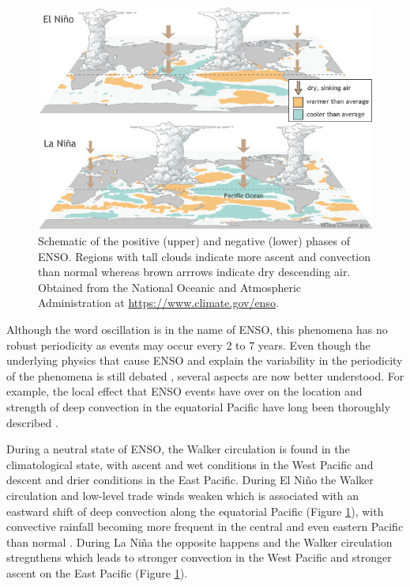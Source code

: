 \begin{figure}[t!]
\centering
\includegraphics[width=\linewidth]{figures/ENSO}
\caption{Schematic of the positive (upper) and negative (lower) phases of ENSO. Regions with tall clouds indicate more ascent and convection than normal whereas brown arrrows indicate dry descending air. Obtained from the National Oceanic and Atmospheric Administration at \url{https://www.climate.gov/enso}. }
\label{fig:enso}
\end{figure}  
  Although the word oscillation is in the name of ENSO, this phenomena has no robust periodicity as events may occur every 2 to 7 years. Even though the underlying physics that cause ENSO and explain the variability in the periodicity of the phenomena is still debated \citep{wang2004,christensen2017}, several aspects are now better understood. 
For example, the local effect that ENSO events have over on the location and strength of deep convection in the equatorial Pacific have long been thoroughly described \citep{trenberth1997,neelin1998}. 

During a neutral state of ENSO, the Walker circulation is found in the climatological state, with ascent and wet conditions in the West Pacific  and descent and drier conditions in the East Pacific. During El Niño the Walker circulation and low-level trade winds weaken which is associated with an eastward shift of deep convection along the equatorial Pacific (Figure \ref{fig:enso}), with convective rainfall becoming more frequent in the central and even eastern Pacific than normal \citep{neelin1998,wang2004}. During La Niña the opposite happens and the Walker circulation stregnthens which leads to stronger convection in the West Pacific and stronger ascent on the East Pacific (Figure \ref{fig:enso}). 


